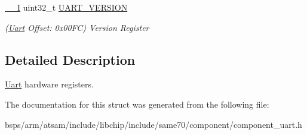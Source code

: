\begin{DoxyCompactItemize}
\item 
\mbox{\label{structUart_aee458072bf327f78641e25fed1bc0e7e}} 
\mbox{\hyperlink{core__cm7_8h_af63697ed9952cc71e1225efe205f6cd3}{\+\_\+\+\_\+I}} uint32\+\_\+t \mbox{\hyperlink{structUart_aee458072bf327f78641e25fed1bc0e7e}{U\+A\+R\+T\+\_\+\+V\+E\+R\+S\+I\+ON}}
\begin{DoxyCompactList}\small\item\em (\mbox{\hyperlink{structUart}{Uart}} Offset\+: 0x00\+FC) Version Register \end{DoxyCompactList}\end{DoxyCompactItemize}


\subsection{Detailed Description}
\mbox{\hyperlink{structUart}{Uart}} hardware registers. 

The documentation for this struct was generated from the following file\+:\begin{DoxyCompactItemize}
\item 
bsps/arm/atsam/include/libchip/include/same70/component/component\+\_\+uart.\+h\end{DoxyCompactItemize}
